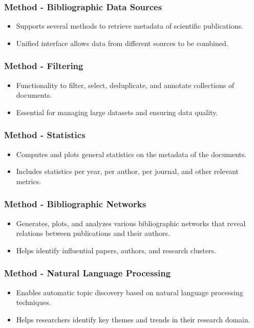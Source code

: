 \documentclass{beamer}
\begin{document}
\begin{frame}
\frametitle{Method - Bibliographic Data Sources}
\begin{itemize}
\item Supports several methods to retrieve metadata of scientific publications.
\item Unified interface allows data from different sources to be combined.
\end{itemize}
\end{frame}

\begin{frame}
\frametitle{Method - Filtering}
\begin{itemize}
\item Functionality to filter, select, deduplicate, and annotate collections of documents.
\item Essential for managing large datasets and ensuring data quality.
\end{itemize}
\end{frame}

\begin{frame}
\frametitle{Method - Statistics}
\begin{itemize}
\item Computes and plots general statistics on the metadata of the documents.
\item Includes statistics per year, per author, per journal, and other relevant metrics.
\end{itemize}
\end{frame}

\begin{frame}
\frametitle{Method - Bibliographic Networks}
\begin{itemize}
\item Generates, plots, and analyzes various bibliographic networks that reveal relations between publications and their authors.
\item Helps identify influential papers, authors, and research clusters.
\end{itemize}
\end{frame}

\begin{frame}
\frametitle{Method - Natural Language Processing}
\begin{itemize}
\item Enables automatic topic discovery based on natural language processing techniques.
\item Helps researchers identify key themes and trends in their research domain.
\end{itemize}
\end{frame}
\end{document}
